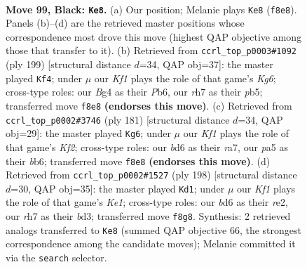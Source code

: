 \documentclass[11pt]{article}
\begin{document}
\clearpage

\begin{figure}[p]\centering
\begin{subfigure}{0.46\textwidth}\centering
\resizebox{\linewidth}{!}{%
\newchessgame
\chessboard[
  setfen={5k2/7R/1P1B4/P2N4/4B1b1/1K5p/8/6r1 b - - 4 99},
  showmover=false,
  pgfstyle=straightmove, color=movearrow, markmove={f8-e8}
]}
\caption{}
\end{subfigure}\hfill
\begin{subfigure}{0.46\textwidth}\centering
\resizebox{\linewidth}{!}{%
\newchessgame
\chessboard[
  setfen={8/8/1p1p4/1P1Bn3/1bP5/6k1/6R1/3K4 b - - 76 100},
  showmover=false,
  pgfstyle=straightmove, color=movearrow, markmove={g3-f4}
]}
\caption{}
\end{subfigure}
\\[4pt]
\begin{subfigure}{0.46\textwidth}\centering
\resizebox{\linewidth}{!}{%
\newchessgame
\chessboard[
  setfen={8/R4k2/1B2b3/4Pp2/5P1K/3r4/8/8 b - - 80 91},
  showmover=false,
  pgfstyle=straightmove, color=movearrow, markmove={f7-g6}
]}
\caption{}
\end{subfigure}\hfill
\begin{subfigure}{0.46\textwidth}\centering
\resizebox{\linewidth}{!}{%
\newchessgame
\chessboard[
  setfen={8/8/3k1P2/6R1/3Bp3/3bP3/4r3/4K3 w - - 9 100},
  showmover=false,
  pgfstyle=straightmove, color=movearrow, markmove={e1-d1}
]}
\caption{}
\end{subfigure}
\caption{\textbf{Move 99, Black: \texttt{Ke8}.} (a) Our position; Melanie plays \texttt{Ke8} (\texttt{f8e8}). Panels (b)--(d) are the retrieved master positions whose correspondence most drove this move (highest QAP objective among those that transfer to it). (b) Retrieved from \texttt{ccrl\_top\_p0003\#1092} (ply 199) [structural distance $d$=34, QAP obj=37]: the master played \texttt{Kf4}; under $\mu$ our \emph{Kf1} plays the role of that game's \emph{Kg6}; cross-type roles: our \emph{B}g4 as their \emph{P}b6, our \emph{r}h7 as their \emph{p}b5; transferred move \texttt{f8e8} \textbf{(endorses this move)}. (c) Retrieved from \texttt{ccrl\_top\_p0002\#3746} (ply 181) [structural distance $d$=34, QAP obj=29]: the master played \texttt{Kg6}; under $\mu$ our \emph{Kf1} plays the role of that game's \emph{Kf2}; cross-type roles: our \emph{b}d6 as their \emph{r}a7, our \emph{p}a5 as their \emph{b}b6; transferred move \texttt{f8e8} \textbf{(endorses this move)}. (d) Retrieved from \texttt{ccrl\_top\_p0002\#1527} (ply 198) [structural distance $d$=30, QAP obj=35]: the master played \texttt{Kd1}; under $\mu$ our \emph{Kf1} plays the role of that game's \emph{Ke1}; cross-type roles: our \emph{b}d6 as their \emph{r}e2, our \emph{r}h7 as their \emph{b}d3; transferred move \texttt{f8g8}. Synthesis: 2 retrieved analogs transferred to \texttt{Ke8} (summed QAP objective 66, the strongest correspondence among the candidate moves); Melanie committed it via the \texttt{search} selector.}
\label{fig:thought-m197}
\end{figure}
\end{document}
